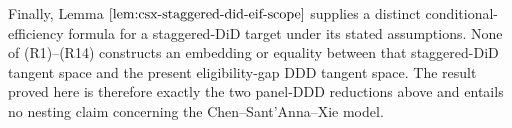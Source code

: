 Finally, Lemma \(\ref{lem:csx-staggered-did-eif-scope}\) supplies a distinct conditional-efficiency formula for a staggered-DiD target under its stated assumptions.  None of (R1)--(R14) constructs an embedding or equality between that staggered-DiD tangent space and the present eligibility-gap DDD tangent space.  The result proved here is therefore exactly the two panel-DDD reductions above and entails no nesting claim concerning the Chen--Sant'Anna--Xie model.
